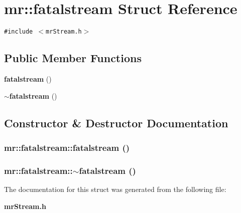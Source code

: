 \section{mr::fatalstream Struct Reference}
\label{structmr_1_1fatalstream}
{\tt \#include $<$mr\-Stream.h$>$}

\subsection*{Public Member Functions}
\begin{CompactItemize}
\item 
{\bf fatalstream} ()
\item 
{\bf $\sim$fatalstream} ()
\end{CompactItemize}


\subsection{Constructor \& Destructor Documentation}
\subsubsection{\setlength{\rightskip}{0pt plus 5cm}mr::fatalstream::fatalstream ()\hspace{0.3cm}{\tt  [inline]}}\label{structmr_1_1fatalstream_a0}


\subsubsection{\setlength{\rightskip}{0pt plus 5cm}mr::fatalstream::$\sim${\bf fatalstream} ()\hspace{0.3cm}{\tt  [inline]}}\label{structmr_1_1fatalstream_a1}




The documentation for this struct was generated from the following file:\begin{CompactItemize}
\item 
{\bf mr\-Stream.h}\end{CompactItemize}

